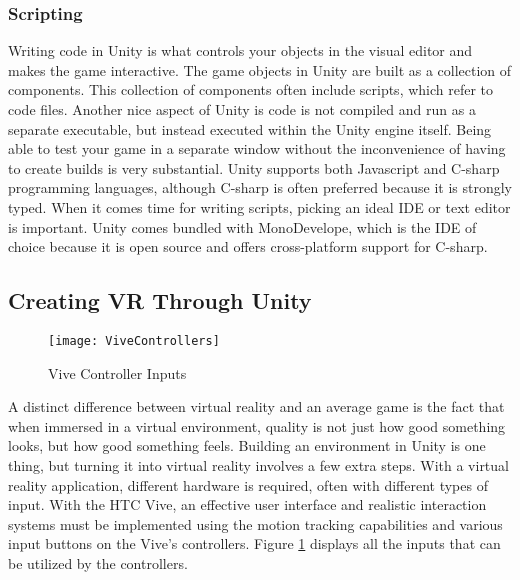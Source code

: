 
 \subsubsection{Scripting}
 
 \par Writing code in Unity is what controls your objects in the visual editor and makes the game interactive.  The game objects in Unity are built as a collection of components. This collection of components often include scripts, which refer to code files. Another nice aspect of Unity is code is not compiled and run as a separate executable, but instead executed within the Unity engine itself. Being able to test your game in a separate window without the inconvenience of having to create builds is very substantial. Unity supports both Javascript and C-sharp programming languages, although C-sharp is often preferred because it is strongly typed. When it comes time for writing scripts, picking an ideal IDE or text editor is important. Unity comes bundled with MonoDevelope, which is the IDE of choice because it is open source and offers cross-platform support for C-sharp. 

\subsection{Creating VR Through Unity}\label{creating VR through Unity}

\begin{figure}[h]
	\centering
	\texttt{[image: ViveControllers]}
	\caption{Vive Controller Inputs \cite{ViveControllers}}
	\label{fig:ViveControllers}
\end{figure}

A distinct difference between virtual reality and an average game is the fact that when immersed in a virtual environment, quality is not just how good something looks, but how good something feels. Building an environment in Unity is one thing, but turning it into virtual reality involves a few extra steps. With a virtual reality application, different hardware is required, often with different types of input. With the HTC Vive, an effective user interface and realistic interaction systems must be implemented using the motion tracking capabilities and various input buttons on the Vive's controllers. Figure \ref{fig:ViveControllers} displays all the inputs that can be utilized by the controllers. 


